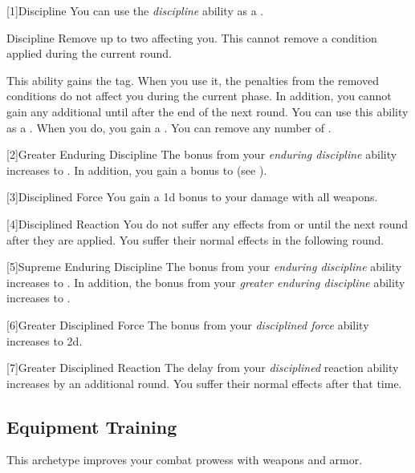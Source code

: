         [1]{Discipline} You can use the \textit{discipline} ability as a .
        \begin{freeability}{Discipline}
            Remove up to two  affecting you.
            This cannot remove a condition applied during the current round.

            \rankline
             This ability gains the  tag.
            When you use it, the penalties from the removed conditions do not affect you during the current phase.
            In addition, you cannot gain any additional  until after the end of the next round.
             You can use this ability as a .
            When you do, you gain a .
             You can remove any number of .
        \end{freeability}

        [2]{Greater Enduring Discipline}
        The bonus from your \textit{enduring discipline} ability increases to .
        In addition, you gain a  bonus to  (see ).

        [3]{Disciplined Force}
        You gain a \plus1d bonus to your damage with all weapons.

        [4]{Disciplined Reaction}
        You do not suffer any effects from  or  until the next round after they are applied.
        You suffer their normal effects in the following round.

        [5]{Supreme Enduring Discipline}
        The bonus from your \textit{enduring discipline} ability increases to .
        In addition, the bonus from your \textit{greater enduring discipline} ability increases to .

        [6]{Greater Disciplined Force} The bonus from your \textit{disciplined force} ability increases to \plus2d.

        [7]{Greater Disciplined Reaction}
        The delay from your \textit{disciplined} reaction ability increases by an additional round.
        You suffer their normal effects after that time.

    \newpage
    \subsection{Equipment Training}
        This archetype improves your combat prowess with weapons and armor.

